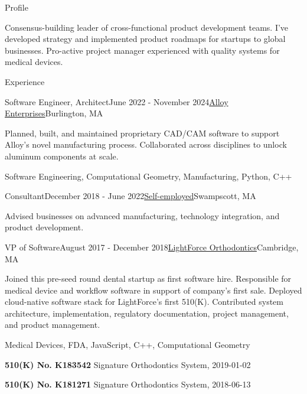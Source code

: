 \documentclass{resume}
\begin{document}
\begin{rSection}{Profile}
\item Consensus-building leader of cross-functional product development teams. I've developed strategy and implemented product roadmaps for startups to global businesses. Pro-active project manager experienced with quality systems for medical devices.
\end{rSection}

\begin{rSection}{Experience}

\begin{rSubsection}{Software Engineer, Architect}{June 2022 - November 2024}{\href{https://alloyenterprises.co}{Alloy Enterprises}}{Burlington, MA}
\item Planned, built, and maintained proprietary CAD/CAM software to support Alloy's novel manufacturing process. Collaborated across disciplines to unlock aluminum components at scale.
\item Software Engineering, Computational Geometry, Manufacturing, Python, C++
\end{rSubsection}

\begin{rSubsection}{Consultant}{December 2018 - June 2022}{\href{https://metatooth.com/services}{Self-employed}}{Swampscott, MA}
\item Advised businesses on advanced manufacturing, technology integration, and product development.
\end{rSubsection}

\begin{rSubsection}{VP of Software}{August 2017 - December 2018}{\href{https://lightforceortho.com}{LightForce Orthodontics}}{Cambridge, MA}
\item Joined this pre-seed round dental startup as first software hire. Responsible for medical device and workflow software in support of company's first sale. Deployed cloud-native software stack for LightForce's first 510(K). Contributed system architecture, implementation, regulatory documentation, project management, and product management.
\item Medical Devices, FDA, JavaScript, C++, Computational Geometry
\item \textbf{510(K) No. K183542} Signature Orthodontics System, 2019-01-02
\item \textbf{510(K) No. K181271} Signature Orthodontics System, 2018-06-13
\end{rSubsection}


\end{rSection}
\end{document}

